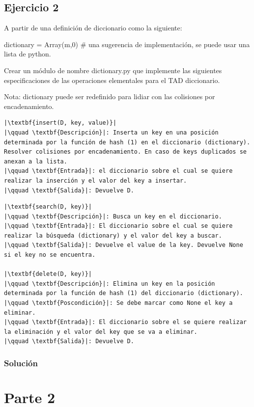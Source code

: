 \documentclass{article}
\begin{document}
\subsection*{Ejercicio 2}
A partir de una definición de diccionario como la siguiente:

dictionary = Array(m,0) \# una sugerencia de implementación, se puede usar una lista de python.

Crear un módulo de nombre dictionary.py que implemente las siguientes especificaciones de las operaciones elementales para el TAD diccionario.

Nota: dictionary puede ser redefinido para lidiar con las colisiones por encadenamiento.

\begin{lstlisting}
|\textbf{insert(D, key, value)}|
|\qquad \textbf{Descripción}|: Inserta un key en una posición determinada por la función de hash (1) en el diccionario (dictionary). Resolver colisiones por encadenamiento. En caso de keys duplicados se anexan a la lista.
|\qquad \textbf{Entrada}|: el diccionario sobre el cual se quiere realizar la inserción y el valor del key a insertar.        
|\qquad \textbf{Salida}|: Devuelve D.
\end{lstlisting}
\pagebreak
\begin{lstlisting}
|\textbf{search(D, key)}|
|\qquad \textbf{Descripción}|: Busca un key en el diccionario.
|\qquad \textbf{Entrada}|: El diccionario sobre el cual se quiere realizar la búsqueda (dictionary) y el valor del key a buscar.
|\qquad \textbf{Salida}|: Devuelve el value de la key. Devuelve None si el key no se encuentra.        

|\textbf{delete(D, key)}|
|\qquad \textbf{Descripción}|: Elimina un key en la posición determinada por la función de hash (1) del diccionario (dictionary).
|\qquad \textbf{Poscondición}|: Se debe marcar como None el key a eliminar.
|\qquad \textbf{Entrada}|: El diccionario sobre el se quiere realizar la eliminación y el valor del key que se va a eliminar.
|\qquad \textbf{Salida}|: Devuelve D.
\end{lstlisting}
\subsubsection*{Solución}
\pagebreak
{}


\section*{Parte 2}
\end{document}
